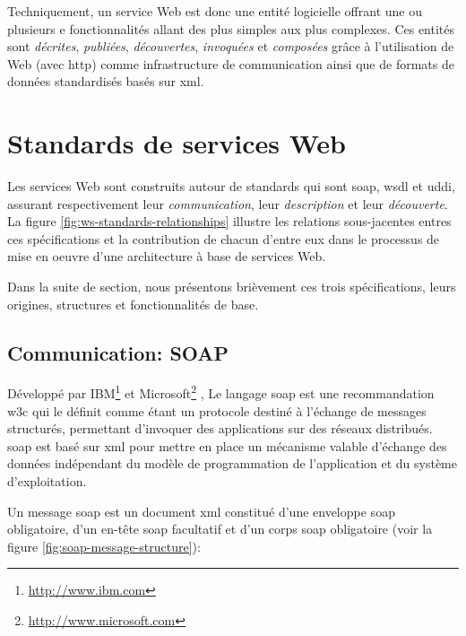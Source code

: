   Techniquement, un service Web est donc une entité logicielle offrant
  une ou plusieurs e fonctionnalités allant des plus simples aux plus
  complexes. Ces entités sont \emph{décrites}, \emph{publiées},
  \emph{découvertes}, \emph{invoquées} et \emph{composées} grâce à
  l'utilisation de Web (avec \acrshort{http}) comme infrastructure de
  communication ainsi que de formats de données standardisés basés sur
  \acrshort{xml}.


\section{Standards de services Web}
\label{sec:reference-arch}
Les services Web sont construits autour de standards qui sont
\acrshort{soap}, \acrshort{wsdl} et \acrshort{uddi}, assurant
respectivement leur \emph{communication}, leur \emph{description} et
leur \emph{découverte}. La figure \ref{fig:ws-standards-relationships}
illustre les relations sous-jacentes entres ces spécifications et la
contribution de chacun d'entre eux dans le processus de mise en oeuvre
d'une architecture à base de services Web.



Dans la suite de section, nous présentons brièvement ces trois
spécifications, leurs origines, structures et fonctionnalités de base.

  \subsection{Communication: SOAP}
  \label{sec:soap}
  Développé par IBM\footnote{\url{http://www.ibm.com}} et
  Microsoft\footnote{\url{http://www.microsoft.com}}
  \cite{box2000simple}, Le langage \acrshort{soap} est une
  recommandation \acrshort{w3c} \cite{mitra2003soap} qui le définit
  comme étant un protocole destiné à l'échange de messages structurés,
  permettant d'invoquer des applications sur des réseaux
  distribués. \acrshort{soap} est basé sur \acrshort{xml} pour mettre
  en place un mécanisme valable d'échange des données indépendant du
  modèle de programmation de l'application et du système
  d'exploitation.\medskip

  Un message \acrshort{soap} est un document \acrshort{xml} constitué
  d'une enveloppe \acrshort{soap} obligatoire, d'un en-tête
  \acrshort{soap} facultatif et d'un corps \acrshort{soap} obligatoire
  (voir la figure \ref{fig:soap-message-structure}):

  

